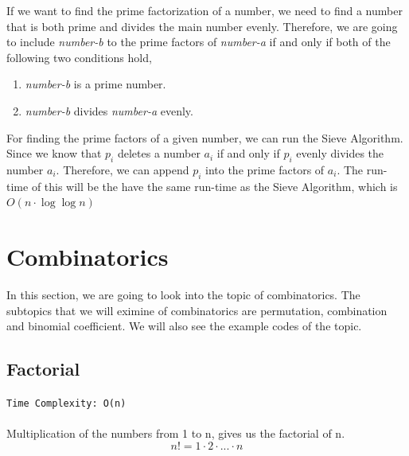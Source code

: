 \documentclass[12pt]{article}
\begin{document}
If we want to find the prime factorization of a number, we need to find a number that is both prime and divides the main number evenly. Therefore, we are going to include \textit{number-b} to the prime factors of \textit{number-a} if and only if both of the following two conditions hold,

\begin{enumerate}[label=(\roman*)]
\item \textit{number-b} is a prime number.
\item \textit{number-b} divides \textit{number-a} evenly.
\end{enumerate}

For finding the prime factors of a given number, we can run the Sieve Algorithm.  Since we know that $p_i$ deletes a number $a_i$ if and only if $p_i$ evenly divides the number $a_i$. Therefore, we can append $p_i$ into the prime factors of $a_i$. The run-time of this will be the have the same run-time as the Sieve Algorithm, which is $O(n \cdot \log{\log{n}})$


\section{Combinatorics}
In this section, we are going to look into the topic of combinatorics. The subtopics that we will eximine of combinatorics are permutation, combination and binomial coefficient. We will also see the example codes of the topic.

\subsection{Factorial}
\texttt{Time Complexity: O(n) } \\ \\
Multiplication of the numbers from 1 to n, gives us the factorial of n.
\[n! = 1 \cdot 2 \cdot ... \cdot n \] 

\clearpage
\end{document}
